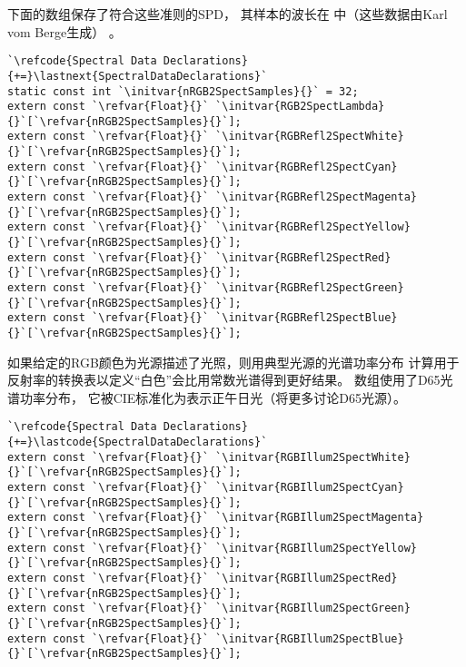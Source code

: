 下面的数组保存了符合这些准则的SPD，
其样本的波长在
中（这些数据由Karl vom Berge生成）
。
\begin{lstlisting}
`\refcode{Spectral Data Declarations}{+=}\lastnext{SpectralDataDeclarations}`
static const int `\initvar{nRGB2SpectSamples}{}` = 32;
extern const `\refvar{Float}{}` `\initvar{RGB2SpectLambda}{}`[`\refvar{nRGB2SpectSamples}{}`];
extern const `\refvar{Float}{}` `\initvar{RGBRefl2SpectWhite}{}`[`\refvar{nRGB2SpectSamples}{}`];
extern const `\refvar{Float}{}` `\initvar{RGBRefl2SpectCyan}{}`[`\refvar{nRGB2SpectSamples}{}`];
extern const `\refvar{Float}{}` `\initvar{RGBRefl2SpectMagenta}{}`[`\refvar{nRGB2SpectSamples}{}`];
extern const `\refvar{Float}{}` `\initvar{RGBRefl2SpectYellow}{}`[`\refvar{nRGB2SpectSamples}{}`];
extern const `\refvar{Float}{}` `\initvar{RGBRefl2SpectRed}{}`[`\refvar{nRGB2SpectSamples}{}`];
extern const `\refvar{Float}{}` `\initvar{RGBRefl2SpectGreen}{}`[`\refvar{nRGB2SpectSamples}{}`];
extern const `\refvar{Float}{}` `\initvar{RGBRefl2SpectBlue}{}`[`\refvar{nRGB2SpectSamples}{}`];
\end{lstlisting}

如果给定的RGB颜色为光源描述了光照，则用典型光源的光谱功率分布
计算用于反射率的转换表以定义“白色”会比用常数光谱得到更好结果。
数组使用了D65光谱功率分布，
它被CIE标准化为表示正午日光（将更多讨论D65光源）。
\begin{lstlisting}
`\refcode{Spectral Data Declarations}{+=}\lastcode{SpectralDataDeclarations}`
extern const `\refvar{Float}{}` `\initvar{RGBIllum2SpectWhite}{}`[`\refvar{nRGB2SpectSamples}{}`];
extern const `\refvar{Float}{}` `\initvar{RGBIllum2SpectCyan}{}`[`\refvar{nRGB2SpectSamples}{}`];
extern const `\refvar{Float}{}` `\initvar{RGBIllum2SpectMagenta}{}`[`\refvar{nRGB2SpectSamples}{}`];
extern const `\refvar{Float}{}` `\initvar{RGBIllum2SpectYellow}{}`[`\refvar{nRGB2SpectSamples}{}`];
extern const `\refvar{Float}{}` `\initvar{RGBIllum2SpectRed}{}`[`\refvar{nRGB2SpectSamples}{}`];
extern const `\refvar{Float}{}` `\initvar{RGBIllum2SpectGreen}{}`[`\refvar{nRGB2SpectSamples}{}`];
extern const `\refvar{Float}{}` `\initvar{RGBIllum2SpectBlue}{}`[`\refvar{nRGB2SpectSamples}{}`];
\end{lstlisting}

